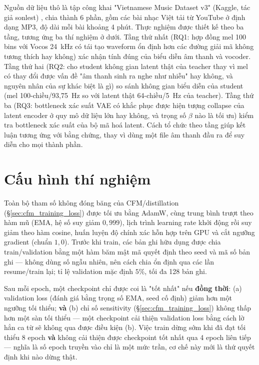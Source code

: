 \documentclass[a4paper,13pt,oneside]{report}
\begin{document}
Nguồn dữ liệu thô là tập công khai "Vietnamese Music Dataset v3" (Kaggle, tác giả sonlest) \cite{vnmusicdataset}, chia thành 6 phần, gồm các bài nhạc Việt tải từ YouTube ở định dạng MP3, độ dài mỗi bài khoảng 4 phút.
Thực nghiệm được thiết kế theo ba tầng, tương ứng ba thí nghiệm ở dưới. Tầng thứ nhất (RQ1: hợp đồng mel 100 bins với Vocos 24~kHz có tái tạo waveform ổn định hơn các đường giải mã không tương thích hay không) xác nhận tính đúng của biểu diễn âm thanh và vocoder. Tầng thứ hai (RQ2: cho student không gian latent thật của teacher thay vì mel có thay đổi được vấn đề "âm thanh sinh ra nghe như nhiễu" hay không, và nguyên nhân của sự khác biệt là gì) so sánh không gian biểu diễn của student (mel 100-chiều/93,75~Hz so với latent thật 64-chiều/5~Hz của teacher). Tầng thứ ba (RQ3: bottleneck xác suất VAE có khắc phục được hiện tượng collapse của latent encoder ở quy mô dữ liệu lớn hay không, và trọng số $\beta$ nào là tối ưu) kiểm tra bottleneck xác suất của bộ mã hoá latent. Cách tổ chức theo tầng giúp kết luận tương ứng với bằng chứng, thay vì dùng một file âm thanh đầu ra để suy diễn cho mọi thành phần.

\section{Cấu hình thí nghiệm}
\label{sec:early_stopping_full}
Toàn bộ tham số không đóng băng của CFM/distillation (\S\ref{sec:cfm_training_loss})
được tối ưu bằng AdamW, cùng trung bình trượt theo hàm mũ (EMA, hệ số suy giảm $0{,}999$),
lịch trình learning rate khởi động rồi suy giảm theo hàm cosine, huấn luyện độ chính xác
hỗn hợp trên GPU và cắt ngưỡng gradient (chuẩn $1,0$). Trước khi train, các bản ghi hữu
dụng được chia train/validation bằng một hàm băm mật mã quyết định theo seed và mã số bản
ghi — không dùng số ngẫu nhiên, nên cách chia ổn định qua các lần resume/train lại; tỉ lệ
validation mặc định $5\%$, tối đa 128 bản ghi.

Sau mỗi epoch, một checkpoint chỉ được coi là "tốt nhất" nếu \textbf{đồng thời}: (a)
validation loss (đánh giá bằng trọng số EMA, seed cố định) giảm hơn một ngưỡng tối thiểu;
\textbf{và} (b) chỉ số sensitivity (\S\ref{sec:cfm_training_loss}) không thấp hơn một sàn
tối thiểu — một checkpoint cải thiện validation loss bằng cách lờ hẳn ca từ sẽ không qua
được điều kiện (b). Việc train dừng sớm khi đã đạt tối thiểu 8 epoch \textbf{và} không cải
thiện được checkpoint tốt nhất qua 4 epoch liên tiếp — nghĩa là số epoch truyền vào chỉ là
một mức trần, cơ chế này mới là thứ quyết định khi nào dừng thật.
\end{document}
